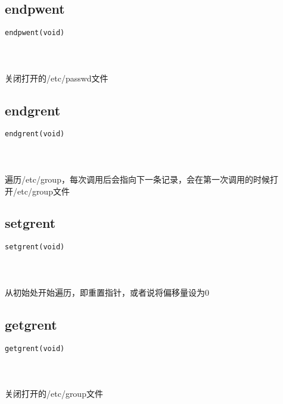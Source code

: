 \documentclass[10pt,a4paper]{article}
\begin{document}
\subsection{endpwent}
\begin{spacing}{2.0}
\lstset{language=C,numbers=none}
\begin{lstlisting}
endpwent(void)
\end{lstlisting}
{\large\color[rgb]{0.2,0.4,0.6}{void:}}
\paragraph{ \ \ }关闭打开的/etc/passwd文件
\end{spacing}

\subsection{endgrent}
\begin{spacing}{2.0}
\lstset{language=C,numbers=none}
\begin{lstlisting}
endgrent(void)
\end{lstlisting}
{\large\color[rgb]{0.2,0.4,0.6}{void:}}
\paragraph{ \ \ }遍历/etc/group，每次调用后会指向下一条记录，会在第一次调用的时候打开/etc/group文件
\end{spacing}

\subsection{setgrent}
\begin{spacing}{2.0}
\lstset{language=C,numbers=none}
\begin{lstlisting}
setgrent(void)
\end{lstlisting}
{\large\color[rgb]{0.2,0.4,0.6}{void:}}
\paragraph{ \ \ }从初始处开始遍历，即重置指针，或者说将偏移量设为0
\end{spacing}

\subsection{getgrent}
\begin{spacing}{2.0}
\lstset{language=C,numbers=none}
\begin{lstlisting}
getgrent(void)
\end{lstlisting}
{\large\color[rgb]{0.2,0.4,0.6}{void:}}
\paragraph{ \ \ }关闭打开的/etc/group文件
\end{spacing}
\end{document}
